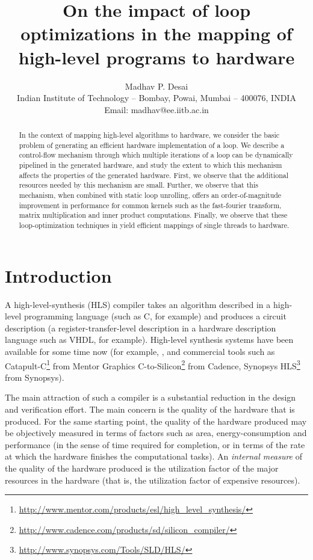 \documentclass[conference]{IEEEtran}
\title{On the impact of loop optimizations in the mapping of high-level programs to hardware}
\author{Madhav P. Desai\\
  Indian Institute of Technology -- Bombay, Powai, Mumbai -- 400076, INDIA\\
  Email: madhav@ee.iitb.ac.in }
\begin{document}
\maketitle
\thispagestyle{empty}

\begin{abstract}

  In the context of mapping high-level algorithms to hardware,
  we consider the basic problem of generating an efficient hardware 
  implementation of a loop.  We describe a control-flow mechanism through
  which multiple iterations of a loop can be dynamically pipelined in
  the generated hardware,  and study the extent to which this 
  mechanism affects the properties of the generated hardware.
  First, we observe that the additional resources needed by this
  mechanism are small.  Further, we observe that this mechanism, when
  combined with static loop unrolling, offers an order-of-magnitude improvement 
  in performance for common kernels such as the fast-fourier transform,
  matrix multiplication and inner product computations.  
  Finally, we observe that these loop-optimization techniques in
  yield efficient mappings of single threads to hardware.  %

\end{abstract}

\section{Introduction}

A high-level-synthesis (HLS) compiler takes an algorithm described in
a high-level programming language (such as C, for example) and produces a circuit
description (a register-transfer-level description in a hardware
description language such as VHDL, for example).
High-level synthesis systems have been available for some time
now (for example, \cite{pegasus-cash}, \cite{spark-vlsi-paper} and
commercial tools such as Catapult-C\footnote{\url{http://www.mentor.com/products/esl/high_level_synthesis/}} from Mentor Graphics
C-to-Silicon\footnote{\url{http://www.cadence.com/products/sd/silicon_compiler/}} from Cadence,
Synopsys HLS\footnote{\url{http://www.synopsys.com/Tools/SLD/HLS/}} from Synopsys).

The main attraction of such a compiler is a substantial reduction in the design and verification effort.  The
main concern is the quality of the hardware that is produced.
For the same starting point, the quality of the hardware produced may be objectively
measured in terms of factors such as area, energy-consumption and performance (in the
sense of time required for completion, or in terms of the rate at which the hardware
finishes the computational tasks).  An {\em internal measure} of the quality of the
hardware produced is the utilization factor of the major resources in the hardware (that is,
the utilization factor of expensive resources).  
\end{document}
